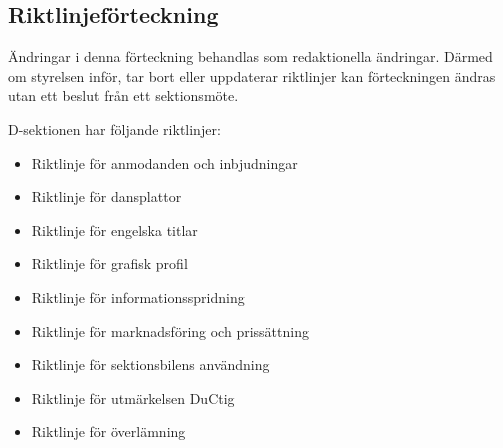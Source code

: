 \documentclass[]{dsekprotokoll}
\begin{document}
\subsection{Riktlinjeförteckning}
Ändringar i denna förteckning behandlas som redaktionella ändringar. Därmed om styrelsen inför, tar bort eller uppdaterar riktlinjer kan förteckningen ändras utan ett beslut från ett sektionsmöte.

D-sektionen har följande riktlinjer:
\begin{itemize}
    \item Riktlinje för anmodanden och inbjudningar
    \item Riktlinje för dansplattor
    \item Riktlinje för engelska titlar
    \item Riktlinje för grafisk profil
    \item Riktlinje för informationsspridning
    \item Riktlinje för marknadsföring och prissättning
    \item Riktlinje för sektionsbilens användning
    \item Riktlinje för utmärkelsen DuCtig
    \item Riktlinje för överlämning
\end{itemize}
\end{document}
